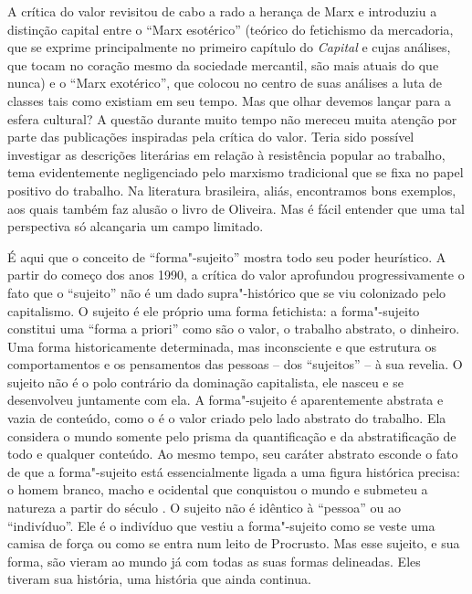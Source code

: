 A crítica do valor revisitou de cabo a rado a herança de Marx e
introduziu a distinção capital entre o ``Marx esotérico'' (teórico do
fetichismo da mercadoria, que se exprime principalmente no primeiro
capítulo do \emph{Capital} e cujas análises, que tocam no coração mesmo
da sociedade mercantil, são mais atuais do que nunca) e o ``Marx
exotérico'', que colocou no centro de suas análises a luta de classes
tais como existiam em seu tempo. Mas que olhar devemos lançar para a
esfera cultural? A questão durante muito tempo não mereceu muita atenção
por parte das publicações inspiradas pela crítica do valor. Teria sido
possível investigar as descrições literárias em relação à resistência
popular ao trabalho, tema evidentemente negligenciado pelo marxismo
tradicional que se fixa no papel positivo do trabalho. Na literatura
brasileira, aliás, encontramos bons exemplos, aos quais também faz
alusão o livro de Oliveira. Mas é fácil entender que uma tal perspectiva
só alcançaria um campo limitado.

É aqui que o conceito de ``forma"-sujeito'' mostra todo seu poder
heurístico. A partir do começo dos anos 1990, a crítica do valor
aprofundou progressivamente o fato que o ``sujeito'' não é um dado
supra"-histórico que se viu colonizado pelo capitalismo. O sujeito é ele
próprio uma forma fetichista: a forma"-sujeito constitui uma ``forma a
priori'' como são o valor, o trabalho abstrato, o dinheiro. Uma forma
historicamente determinada, mas inconsciente e que estrutura os
comportamentos e os pensamentos das pessoas -- dos ``sujeitos'' -- à sua
revelia. O sujeito não é o polo contrário da dominação capitalista, ele
nasceu e se desenvolveu juntamente com ela. A forma"-sujeito é
aparentemente abstrata e vazia de conteúdo, como o é o valor criado pelo
lado abstrato do trabalho. Ela considera o mundo somente pelo prisma da
quantificação e da abstratificação de todo e qualquer conteúdo. Ao mesmo
tempo, seu caráter abstrato esconde o fato de que a forma"-sujeito está
essencialmente ligada a uma figura histórica precisa: o homem branco,
macho e ocidental que conquistou o mundo e submeteu a natureza a partir
do século . O sujeito não é idêntico à ``pessoa'' ou ao ``indivíduo''.
Ele é o indivíduo que vestiu a forma"-sujeito como se veste uma camisa de
força ou como se entra num leito de Procrusto. Mas esse sujeito, e sua
forma, são vieram ao mundo já com todas as suas formas delineadas. Eles
tiveram sua história, uma história que ainda continua.

